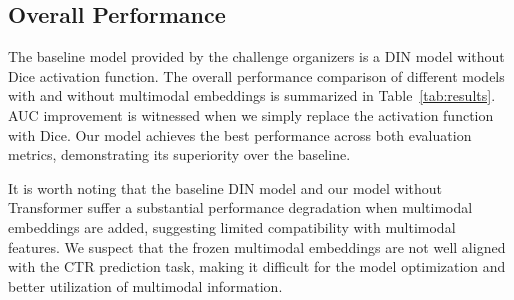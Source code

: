 \documentclass[sigconf, nonacm, screen]{acmart}
\begin{document}
\subsection{Overall Performance}
\begin{table}
  \centering
  \caption{Overall performance evaluation.}
  \label{tab:results}
  \vspace{-2mm}
\end{table}

The baseline model provided by the challenge organizers is a DIN model \cite{DIN} without Dice activation function.
The overall performance comparison of different models with and without multimodal embeddings is summarized in Table~\ref{tab:results}. 
AUC improvement is witnessed when we simply replace the activation function with Dice.
Our model achieves the best performance across both evaluation metrics, demonstrating its superiority over the baseline.

It is worth noting that the baseline DIN model and our model without Transformer suffer a substantial performance degradation when multimodal embeddings are added, suggesting limited compatibility with multimodal features.
We suspect that the frozen multimodal embeddings are not well aligned with the CTR prediction task, making it difficult for the model optimization and better utilization of multimodal information.
\end{document}
